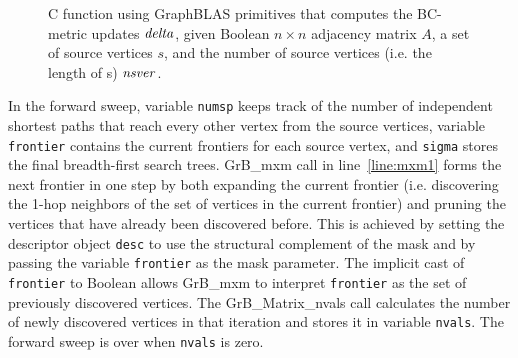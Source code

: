 \begin{figure*}[h]
\caption{C function using GraphBLAS primitives that computes the BC-metric updates ${\it delta}$, given Boolean $n \times n$ adjacency matrix $A$, a set of source vertices $s$, 
and the number of source vertices (i.e. the length of s) ${\it nsver}$.
}
\label{Fig:BClisting}
{\scriptsize

}
\end{figure*}

In the forward sweep, variable {\tt numsp} keeps track of the number of independent shortest paths that reach every other vertex from the source vertices, variable {\tt frontier} contains the current frontiers for each source vertex, and {\tt sigma} stores
the final breadth-first search trees. 
GrB\_mxm call in line~\ref{line:mxm1} forms the next frontier in one step by both expanding the current frontier (i.e. discovering the 1-hop neighbors of the set of vertices in the current frontier) and pruning the vertices that have 
already been discovered before. This is achieved by setting the descriptor object {\tt desc} to use the structural complement of the mask and by passing the 
variable {\tt frontier} as the mask parameter. The implicit cast of {\tt frontier} to Boolean allows GrB\_mxm to interpret {\tt frontier} as the set of previously discovered vertices.
The GrB\_Matrix\_nvals call calculates the number of newly discovered vertices in that iteration and stores it in variable {\tt nvals}. The forward sweep is over when {\tt nvals} is zero.